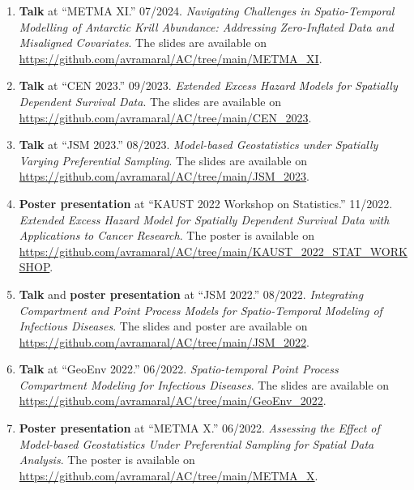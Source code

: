 \documentclass[10pt, ]{article}
\begin{document}
	\begin{enumerate}[noitemsep, topsep=0pt]
		\item \textbf{Talk} at ``METMA XI.'' 07/2024. \textit{Navigating Challenges in Spatio-Temporal Modelling of Antarctic Krill Abundance: Addressing Zero-Inflated Data and Misaligned Covariates}. The slides are available on \href{https://github.com/avramaral/AC/tree/main/METMA\_XI}{\url{https://github.com/avramaral/AC/tree/main/METMA\_XI}}.
		
		\item \textbf{Talk} at ``CEN 2023.'' 09/2023. \textit{Extended Excess Hazard Models for Spatially Dependent Survival Data}. The slides are available on \href{https://github.com/avramaral/AC/tree/main/CEN\_2023}{\url{https://github.com/avramaral/AC/tree/main/CEN\_2023}}.
		
		\item \textbf{Talk} at ``JSM 2023.'' 08/2023. \textit{Model-based Geostatistics under Spatially Varying Preferential Sampling}. The slides are available on \href{https://github.com/avramaral/AC/tree/main/JSM\_2023}{\url{https://github.com/avramaral/AC/tree/main/JSM\_2023}}.
		
		\item \textbf{Poster presentation} at ``KAUST 2022 Workshop on Statistics.'' 11/2022. \textit{Extended Excess Hazard Model for Spatially Dependent Survival Data with Applications to Cancer Research}. The poster is available on \href{https://github.com/avramaral/AC/tree/main/KAUST_2022_STAT_WORKSHOP}{\url{https://github.com/avramaral/AC/tree/main/KAUST_2022_STAT_WORKSHOP}}.
		
		\item \textbf{Talk} and \textbf{poster presentation} at ``JSM 2022.'' 08/2022. \textit{Integrating Compartment and Point Process Models for Spatio-Temporal Modeling of Infectious Diseases}. The slides and poster are available on \href{https://github.com/avramaral/AC/tree/main/JSM\_2022}{\url{https://github.com/avramaral/AC/tree/main/JSM\_2022}}.
		
		\item \textbf{Talk} at ``GeoEnv 2022.'' 06/2022. \textit{Spatio-temporal Point Process Compartment Modeling for Infectious Diseases}. The slides are available on \href{https://github.com/avramaral/AC/tree/main/GeoEnv\_2022}{\url{https://github.com/avramaral/AC/tree/main/GeoEnv\_2022}}.
		
		\item \textbf{Poster presentation} at ``METMA X.'' 06/2022. \textit{Assessing the Effect of Model-based Geostatistics Under Preferential Sampling for Spatial Data Analysis}. The poster is available on \href{https://github.com/avramaral/AC/tree/main/METMA\_X}{\url{https://github.com/avramaral/AC/tree/main/METMA\_X}}.
		

\end{enumerate}
\end{document}
